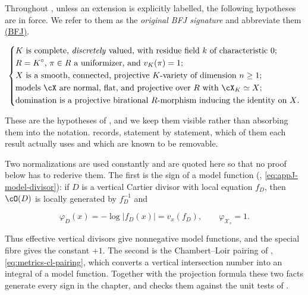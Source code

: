 Throughout , unless an
extension is explicitly labelled, the following hypotheses are in force.  We
refer to them as the \emph{original BFJ signature} and abbreviate them
\hyperref[eq:ch20-standing]{\textup{(BFJ)}}.

\begin{equation}
\label{eq:ch20-standing}
\left\{
\begin{aligned}
 &\text{$K$ is complete, \emph{discretely} valued, with residue field
   $k$ of characteristic $0$;}\\
 &\text{$R=K^\circ$, $\pi\in R$ a uniformizer, and $v_K(\pi)=1$;}\\
 &\text{$X$ is a smooth, connected, projective $K$-variety of dimension
   $n\geq1$;}\\
 &\text{models $\cX$ are normal, flat, and projective over $R$ with
   $\cX_K\simeq X$;}\\
 &\text{domination is a projective birational $R$-morphism inducing the
   identity on $X$.}
\end{aligned}
\right.
\end{equation}

These are the hypotheses of \cite{BFJ16}, and we keep them visible rather
than absorbing them into the notation.   records, statement by statement, which of
them each result actually uses and which are known to be removable.

Two normalizations are used constantly and are quoted here so that no proof
below has to rederive them.  The first is the sign of a model function
(, \eqref{eq:appJ-model-divisor}):
if $D$ is a vertical Cartier divisor with local equation $f_D$, then
$\cO(D)$ is locally generated by $f_D^{-1}$ and

\begin{equation}
\label{eq:ch20-sign}
              \varphi_D(x)=-\log|f_D(x)|=v_x(f_D),
              \qquad \varphi_{\mathcal X_s}=1.
\end{equation}

Thus effective vertical divisors give nonnegative model functions, and the
special fibre gives the constant $+1$.  The second is the
Chambert--Loir pairing of ,
\eqref{eq:metrics-cl-pairing}, which converts a vertical intersection number
into an integral of a model function.  Together with the projection formula
 these two facts generate every sign in
the chapter, and  checks them against the
unit tests of .

